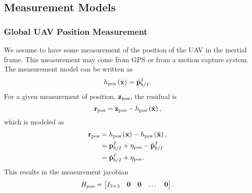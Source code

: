 
\subsection{Measurement Models}

\subsubsection{Global UAV Position Measurement}
We assume to have some measurement of the position of the UAV in the inertial
frame. This measurement may come from GPS or from a motion capture system.
The measurement model can
be written as
\begin{equation}
  h_{\text{pos}} \left( \hat{\boldsymbol{\mathrm{x}}} \right) = \hat{\boldsymbol{\mathrm{p}}}_{b/I}^I.
\end{equation}
For a given measurement of position, $\boldsymbol{\mathrm{z}}_{\text{pos}}$, the residual is
\begin{equation*}
  \boldsymbol{\mathrm{r}}_{\text{pos}} = \boldsymbol{\mathrm{z}}_{\text{pos}} - h_{\text{pos}} \left( \hat{\boldsymbol{\mathrm{x}}}
  \right),
\end{equation*}
which is modeled as
\begin{align*}
  \boldsymbol{\mathrm{r}}_{\text{pos}} &=  h_{\text{pos}} \left( \boldsymbol{\mathrm{x}} \right) - h_{\text{pos}} \left( \hat{\boldsymbol{\mathrm{x}}}
  \right), \\
                        &= \boldsymbol{\mathrm{p}}_{b/I}^I + \eta_{\text{pos}} -
                        \hat{\boldsymbol{\mathrm{p}}}_{b/I}^I \\
                        &= \tilde{\boldsymbol{\mathrm{p}}}_{b/I}^I + \eta_{\text{pos}}.
\end{align*}
This results in the measurement jacobian
\begin{equation*}
  H_{\text{pos}} =
  \begin{bmatrix}
    I_{3 \times 3} & \boldsymbol{\mathrm{0}} & \boldsymbol{\mathrm{0}} & \dots & \boldsymbol{\mathrm{0}}
  \end{bmatrix}.
\end{equation*}


